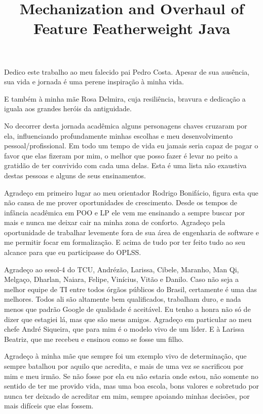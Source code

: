 \documentclass[bacharelado]{unb-cic}
\title{Mechanization and Overhaul of Feature Featherweight Java}
\theoremstyle{definition}
\theoremstyle{definition}
\begin{document}
  \maketitle
  \pretextual

  \begin{dedicatoria}
      Dedico este trabalho ao meu falecido pai Pedro Costa.
      Apesar de sua ausência, sua vida e jornada é uma perene inspiração
      à minha vida.

      E também à minha mãe Rosa Delmira, cuja resiliência,
      bravura e dedicação a iguala aos grandes heróis da antiguidade.
  \end{dedicatoria}

  \begin{agradecimentos}
    No decorrer desta jornada acadêmica alguns personagens chaves cruzaram por ela,
    influenciando profundamente minhas escolhas e meu desenvolvimento pessoal/profissional. Em todo um tempo de vida eu jamais seria capaz de pagar o favor
    que elas fizeram por mim, o melhor que posso fazer é levar no peito a gratidão
    de ter convivido com cada uma delas. Esta é uma lista não exaustiva destas pessoas e alguns de seus ensinamentos.

    Agradeço em primeiro lugar ao meu orientador Rodrigo Bonifácio, figura esta que 
    não cansa de me prover oportunidades de crescimento. Desde os tempos de infância
    acadêmica em POO e LP ele vem me ensinando a sempre buscar por mais e nunca 
    me deixar cair na minha zona de conforto. Agradeço pela oportunidade de trabalhar
    levemente fora de sua área de engenharia de software e me permitir focar em formalização. E acima de tudo por ter feito tudo ao seu alcance para que eu participasse do OPLSS.

    Agradeço ao sesol-4 do TCU, Andrézão, Larissa, Cibele, Maranho, Man Qi, Melgaço,
    Dharlan, Naiara, Felipe, Vinícius, Vitão e Danilo.
    Caso não seja a melhor equipe de TI entre todos órgãos públicos do Brasil,
    certamente é uma das melhores. Todos ali são altamente bem qualificados,
    trabalham duro, e nada menos que padrão Google de qualidade é aceitável.
    Eu tenho a honra não só de dizer que estagiei lá, mas que são meus amigos.
    Agradeço em particular ao meu chefe André Siqueira, que para mim é o modelo vivo de um líder.
    E à Larissa Beatriz, que me recebeu e ensinou como se fosse um filho.

    Agradeço à minha mãe que sempre foi um exemplo vivo de determinação,
    que sempre batalhou por aquilo que acredita, e mais de uma vez se sacrificou
    por mim e meu irmão. Se não fosse por ela eu não estaria onde estou, não somente
    no sentido de ter me provido vida, mas uma boa escola, bons valores e sobretudo
    por nunca ter deixado de acreditar em mim, sempre apoiando minhas decisões, por
    mais difíceis que elas fossem.


\end{agradecimentos}
\end{document}
